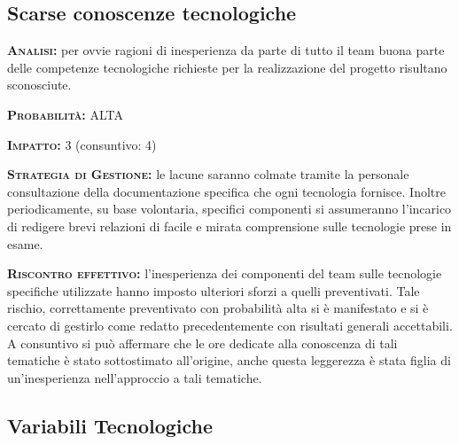 \subsection{Scarse conoscenze tecnologiche}
\begin{description}
	\item{\scshape\bfseries Analisi:} per ovvie ragioni di inesperienza da parte di tutto il team buona parte delle competenze tecnologiche richieste per la realizzazione del progetto risultano sconosciute.
	\item{\scshape\bfseries Probabilità:} ALTA 
	\item{\scshape\bfseries Impatto:} 3 (consuntivo: 4)
	\item{\scshape\bfseries Strategia di Gestione:} le lacune saranno colmate tramite la personale consultazione della documentazione specifica che ogni tecnologia fornisce. Inoltre periodicamente, su base volontaria, specifici componenti si assumeranno l'incarico di redigere brevi relazioni di facile e mirata comprensione sulle tecnologie prese in esame.
	\item{\scshape\bfseries Riscontro effettivo:} l'inesperienza dei componenti del team sulle tecnologie specifiche utilizzate hanno imposto ulteriori sforzi a quelli preventivati. Tale rischio, correttamente preventivato con probabilità alta si è manifestato e si è cercato di gestirlo come redatto precedentemente con risultati generali accettabili. A consuntivo si può affermare che le ore dedicate alla conoscenza di tali tematiche è stato sottostimato all'origine, anche questa leggerezza è stata figlia di un'inesperienza nell'approccio a tali tematiche. 
\end{description}

\subsection{Variabili Tecnologiche}

